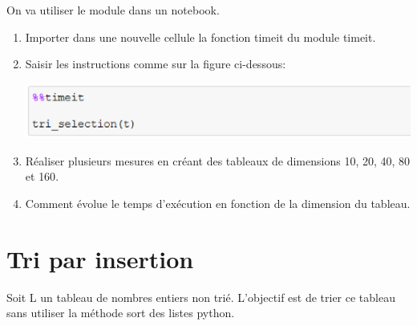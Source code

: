 \documentclass[11pt,a4paper]{article}
\begin{document}
\begin{enumerate}
On va utiliser le module dans un notebook.

\begin{enumerate}
\item Importer dans une nouvelle cellule la fonction \textsf{timeit} du module \textsf{timeit}.
\item Saisir les instructions comme sur la figure ci-dessous:

\includegraphics[scale=0.8]{img/timeit.eps}

\item Réaliser plusieurs mesures en créant des tableaux de dimensions \textsf{10}, \textsf{20}, \textsf{40}, \textsf{80} et \textsf{160}.

\item Comment évolue le temps d'exécution en fonction de la dimension du tableau.
\end{enumerate}
\end{enumerate}



\newpage

\section*{Tri par insertion}


Soit \textsf{L} un tableau de nombres entiers non trié. L'objectif est de trier ce tableau sans utiliser la méthode \textsf{sort} des listes python.
\end{document}
